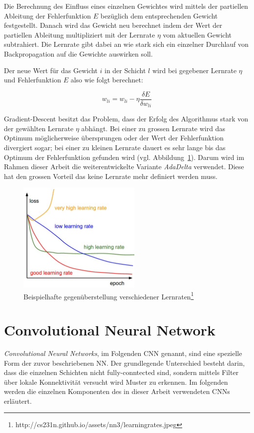 Die Berechnung des Einfluss eines einzelnen Gewichtes wird mittels der partiellen Ableitung der Fehlerfunktion $E$ bezüglich dem entsprechenden Gewicht festgestellt. Danach wird das Gewicht neu berechnet indem der Wert der partiellen Ableitung multipliziert mit der Lernrate $\eta$ vom aktuellen Gewicht subtrahiert. Die Lernrate gibt dabei an wie stark sich ein einzelner Durchlauf von Backpropagation auf die Gewichte auswirken soll. 

Der neue Wert für das Gewicht $i$ in der Schicht $l$ wird bei gegebener Lernrate $\eta$ und Fehlerfunktion $E$ also wie folgt
berechnet:

\begin{equation}
w_{li} = w_{li} - \eta \frac{\delta E}{\delta w_{li}}
\end{equation}

Gradient-Descent besitzt das Problem, dass der Erfolg des Algorithmus stark von der gewählten Lernrate $\eta$ abhängt. Bei einer zu grossen Lernrate wird das Optimum möglicherweise übersprungen oder der Wert der Fehlerfunktion divergiert sogar; bei einer zu kleinen Lernrate dauert es sehr lange bis das Optimum der Fehlerfunktion gefunden wird (vgl. Abbildung~\ref{fig:learn_rates}). Darum wird im Rahmen dieser Arbeit die weiterentwickelte Variante \emph{AdaDelta} \cite{zeiler2012adadelta} verwendet. Diese hat den grossen Vorteil das keine Lernrate mehr definiert werden muss.

\begin{figure}[h]
  \centering
  \includegraphics[width=6cm]{img/learning_rates_comparison}
  \caption{Beispielhafte gegenüberstellung verschiedener Lernraten\protect\footnote{http://cs231n.github.io/assets/nn3/learningrates.jpeg}}
  \label{fig:learn_rates}
\end{figure}

\section{Convolutional Neural Network}
\emph{Convolutional Neural Networks}, im Folgenden \gls{CNN} genannt, sind eine spezielle Form der zuvor beschriebenen NN. Der grundlegende Unterschied besteht darin, dass die einzelnen Schichten nicht fully-conntected sind, sondern mittels Filter über lokale Konnektivität versucht wird Muster zu erkennen. Im folgenden werden die einzelnen Komponenten des in dieser Arbeit verwendeten CNNs erläutert.

